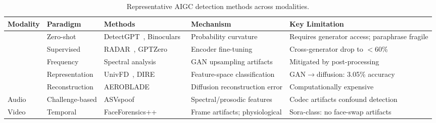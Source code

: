 
\begin{table}[htbp]
\centering
\caption{Representative AIGC detection methods across modalities.}
\label{tab:detection}

\fontsize{7}{7}\selectfont
\setlength{\tabcolsep}{5pt}
\renewcommand{\arraystretch}{1.3}

\begin{tabularx}{\textwidth}{
  >{\centering\arraybackslash}p{1.2cm}
  >{\raggedright\arraybackslash}p{2.0cm}
  >{\raggedright\arraybackslash}p{3.4cm}
  >{\raggedright\arraybackslash}p{3.8cm}
  >{\raggedright\arraybackslash}X
}
\toprule
\textbf{Modality} & \textbf{Paradigm} & \textbf{Methods} & \textbf{Mechanism} & \textbf{Key Limitation} \\
\midrule

\rowcolor{rowgray}
\multirow{2}{*}{Text}
  & Zero-shot
  & DetectGPT~\cite{mitchell2023detectgpt}, Binoculars~\cite{hans2024binoculars}
  & Probability curvature
  & Requires generator access; paraphrase fragile \\[6pt]

\rowcolor{rowgray}
  & Supervised
  & RADAR~\cite{hu2023radar}, GPTZero
  & Encoder fine-tuning
  & Cross-generator drop to $<$60\%~\cite{macko2023multitude} \\

\addlinespace[2pt]
\cmidrule(lr){1-5}
\addlinespace[2pt]

\multirow{3}{*}{Image}
  & Frequency
  & Spectral analysis
  & GAN upsampling artifacts
  & Mitigated by post-processing \\[6pt]

  & Representation
  & UnivFD~\cite{ojha2023univfd}, DIRE~\cite{wang2023dire}
  & Feature-space classification
  & GAN$\to$diffusion: 3.05\% accuracy \\[6pt]

  & Reconstruction
  & AEROBLADE
  & Diffusion reconstruction error
  & Computationally expensive \\

\addlinespace[2pt]
\cmidrule(lr){1-5}
\addlinespace[2pt]

\rowcolor{rowgray}
Audio
  & Challenge-based
  & ASVspoof~\cite{asvspoof2019,asvspoof2021}
  & Spectral/prosodic features
  & Codec artifacts confound detection \\

\addlinespace[2pt]
\cmidrule(lr){1-5}
\addlinespace[2pt]

Video
  & Temporal
  & FaceForensics++~\cite{rossler2019faceforensics}
  & Frame artifacts; physiological
  & Sora-class: no face-swap artifacts \\

\bottomrule
\end{tabularx}
\end{table}
